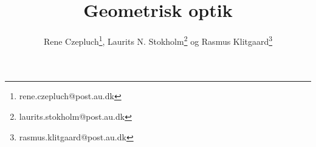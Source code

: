 \documentclass[danish,a4paper,twocolumn, oneside]{memoir}
\title{Geometrisk optik}
\author{Rene Czepluch\thanks{rene.czepluch@post.au.dk}, Laurits N. Stokholm\thanks{laurits.stokholm@post.au.dk} og Rasmus Klitgaard\thanks{rasmus.klitgaard@post.au.dk}}
\date{}
\begin{document}
\newcommand{\forsogEt}{forsøg 1, afbildning med én samlelinse}
\newcommand{\forsogTo}{forsøg 2, forstørrelsesglas}

\maketitle
\noindent







 
\end{document}
